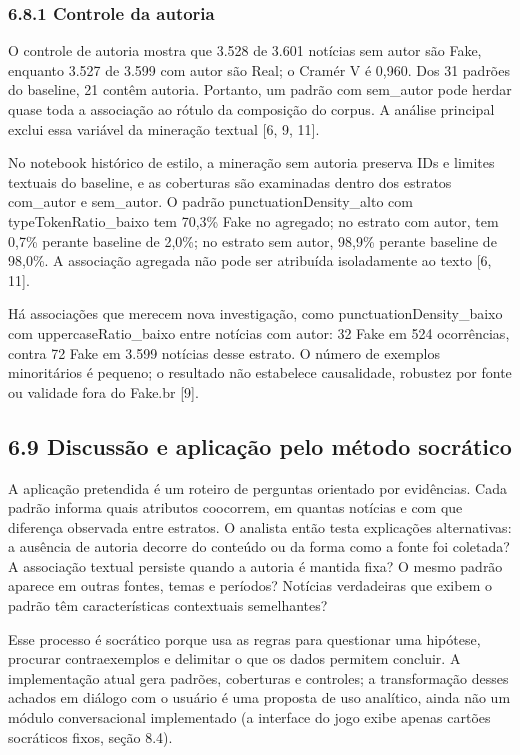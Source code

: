 \documentclass[
  brazilian,
  11pt,
]{article}
\begin{document}
\subsubsection{6.8.1 Controle da autoria}\label{controle-da-autoria}

O controle de autoria mostra que 3.528 de 3.601 notícias sem autor são Fake, enquanto 3.527 de 3.599 com autor são Real; o Cramér V é 0,960. Dos 31 padrões do baseline, 21 contêm autoria. Portanto, um padrão com sem\_autor pode herdar quase toda a associação ao rótulo da composição do corpus. A análise principal exclui essa variável da mineração textual {[}6, 9, 11{]}.

No notebook histórico de estilo, a mineração sem autoria preserva IDs e limites textuais do baseline, e as coberturas são examinadas dentro dos estratos com\_autor e sem\_autor. O padrão punctuationDensity\_alto com typeTokenRatio\_baixo tem 70,3\% Fake no agregado; no estrato com autor, tem 0,7\% perante baseline de 2,0\%; no estrato sem autor, 98,9\% perante baseline de 98,0\%. A associação agregada não pode ser atribuída isoladamente ao texto {[}6, 11{]}.

Há associações que merecem nova investigação, como punctuationDensity\_baixo com uppercaseRatio\_baixo entre notícias com autor: 32 Fake em 524 ocorrências, contra 72 Fake em 3.599 notícias desse estrato. O número de exemplos minoritários é pequeno; o resultado não estabelece causalidade, robustez por fonte ou validade fora do Fake.br {[}9{]}.

\subsection{6.9 Discussão e aplicação pelo método socrático}\label{discussuxe3o-e-aplicauxe7uxe3o-pelo-muxe9todo-socruxe1tico}

A aplicação pretendida é um roteiro de perguntas orientado por evidências. Cada padrão informa quais atributos coocorrem, em quantas notícias e com que diferença observada entre estratos. O analista então testa explicações alternativas: a ausência de autoria decorre do conteúdo ou da forma como a fonte foi coletada? A associação textual persiste quando a autoria é mantida fixa? O mesmo padrão aparece em outras fontes, temas e períodos? Notícias verdadeiras que exibem o padrão têm características contextuais semelhantes?

Esse processo é socrático porque usa as regras para questionar uma hipótese, procurar contraexemplos e delimitar o que os dados permitem concluir. A implementação atual gera padrões, coberturas e controles; a transformação desses achados em diálogo com o usuário é uma proposta de uso analítico, ainda não um módulo conversacional implementado (a interface do jogo exibe apenas cartões socráticos fixos, seção 8.4).
\end{document}

